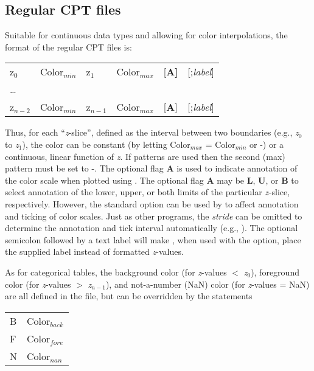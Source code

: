 \subsection{Regular CPT files}

Suitable for continuous data types and allowing for color interpolations, the
format of the regular CPT files is:

\begin{center}
\begin{tabular}{llllll}
z$_0$ &  Color$_{min}$  &  z$_1$ & Color$_{max}$ &  [\bf{A}] & [;\emph{label}] \\
\ldots & & & & & \\
z$_{n-2}$ &  Color$_{min}$ &  z$_{n-1}$ &  Color$_{max}$ &  [\textbf{A}] & [;\emph{label}] \\
\end{tabular}
\end{center}

Thus, for each ``\emph{z}-slice'', defined as the interval between two boundaries
(e.g., \emph{z$_0$} to \emph{z$_1$}), the color can be constant (by letting Color$_{max}$
= Color$_{min}$ or -) or a continuous, linear function of \emph{z}.  If patterns are
used then the second (max) pattern must be set to -.  The optional flag \textbf{A} is used to indicate annotation
of the color scale when plotted using .  The optional flag \textbf{A} may be \textbf{L},
\textbf{U}, or \textbf{B} to select annotation of the lower, upper, or both limits
of the particular $z$-slice, respectively.  However, the standard  option can be used
by  to affect annotation and ticking of color scales. Just as other \GMT{} programs, the \emph{stride} can be omitted to determine the annotation and tick interval automatically (e.g., ).  The optional
semicolon followed by a text label will make , when used with the  option,
place the supplied label instead of formatted \emph{z}-values.

As for categorical tables, the background color (for \emph{z}-values $<$ \emph{z$_0$}), foreground color
(for \emph{z}-values $>$ \emph{z$_{n-1}$}), and not-a-number (NaN) color (for
\emph{z}-values = NaN) are all defined in the 
file, but can be overridden by the statements

\begin{center}
\begin{tabular}{ll}
B &  Color$_{back}$ \\
F &  Color$_{fore}$ \\
N &  Color$_{nan}$ \\
\end{tabular}
\end{center}

